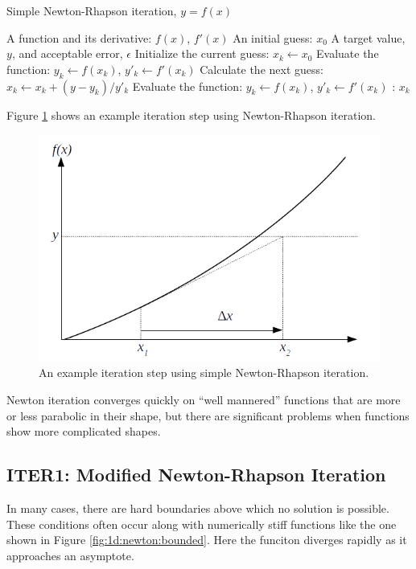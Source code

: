 \documentclass{article}
\begin{document}
\begin{algorithm}
\caption{Simple Newton-Rhapson iteration, $y = f(x)$}\label{alg:1d:newton}
\begin{algorithmic}
\REQUIRE A function and its derivative: $f(x)$, $f'(x)$
\REQUIRE An initial guess: $x_0$
\REQUIRE A target value, $y$, and acceptable error, $\epsilon$
\STATE Initialize the current guess: $x_k \leftarrow x_0$
\STATE Evaluate the function: $y_k \leftarrow f(x_k)$, $y'_k \leftarrow f'(x_k)$
\STATE Calculate the next guess: $x_k \leftarrow x_k + (y - y_k)/y'_k$
\STATE Evaluate the function: $y_k \leftarrow f(x_k)$, $y'_k \leftarrow f'(x_k)$
\ENDWHILE
\RETURN: $x_k$
\end{algorithmic}
\end{algorithm}

Figure \ref{fig:1d:newton} shows an example iteration step using Newton-Rhapson iteration.

\begin{figure}
\centering
\includegraphics[width=0.8\linewidth]{figures/1d_newton}
\caption{An example iteration step using simple Newton-Rhapson iteration.}\label{fig:1d:newton}
\end{figure}

Newton iteration converges quickly on ``well mannered'' functions that are more or less parabolic in their shape, but there are significant problems when functions show more complicated shapes.

\subsection{ITER1: Modified Newton-Rhapson Iteration}

In many cases, there are hard boundaries above which no solution is possible.  These conditions often occur along with numerically stiff functions like the one shown in Figure \ref{fig:1d:newton:bounded}.  Here the funciton diverges rapidly as it approaches an asymptote.
\end{document}
